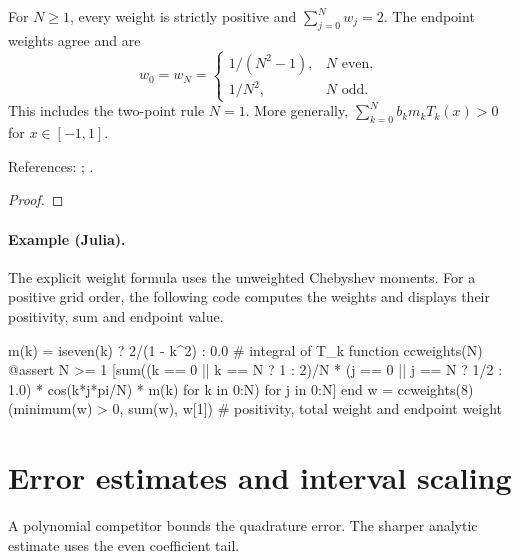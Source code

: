 \begin{theorem}
\label{thm:clenshaw-curtis-positive}
\leanok
For $N\ge1$, every weight is strictly positive and $\sum_{j=0}^Nw_j=2$.
The endpoint weights agree and are
\[
 w_0=w_N=\begin{cases}
 1/(N^2-1),&N\text{ even},\\
 1/N^2,&N\text{ odd}.
 \end{cases}
\]
This includes the two-point rule $N=1$. More generally,
$\sum_{k=0}^Nb_km_kT_k(x)>0$ for $x\in[-1,1]$.

References: \cite[Chapter 19]{atap}; \cite{trefethen-gauss-cc}.
\end{theorem}
\begin{proof}
\leanok
\end{proof}

\paragraph{Example (Julia).} The explicit weight formula uses the unweighted Chebyshev moments. For a positive grid order, the following code computes the weights and displays their positivity, sum and endpoint value.

\begin{juliacode}
m(k) = iseven(k) ? 2/(1 - k^2) : 0.0          # integral of T_k
function ccweights(N)
    @assert N >= 1
    [sum((k == 0 || k == N ? 1 : 2)/N *
    (j == 0 || j == N ? 1/2 : 1.0) * cos(k*j*pi/N) * m(k) for k in 0:N)
    for j in 0:N]
end
w = ccweights(8)
(minimum(w) > 0, sum(w), w[1])    # positivity, total weight and endpoint weight
\end{juliacode}

\section{Error estimates and interval scaling}\label{sec:textbook-cc-error}

A polynomial competitor bounds the quadrature error. The sharper analytic estimate uses the even coefficient tail.


